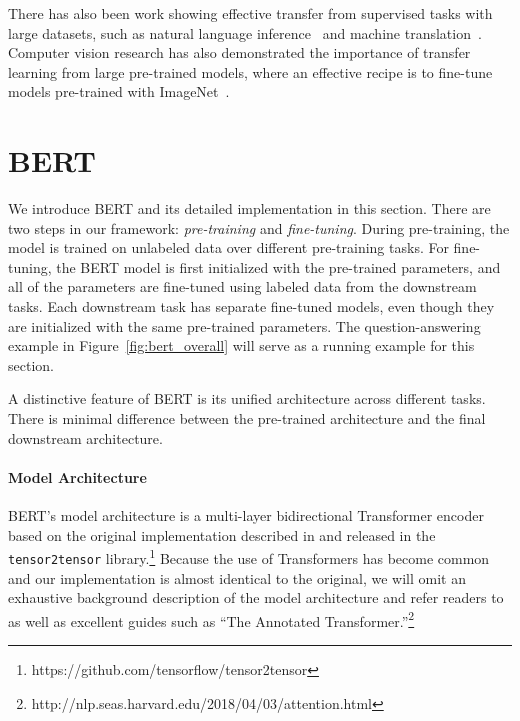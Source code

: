\documentclass[11pt,a4paper]{article}
\begin{document}
There has also been work showing effective transfer from supervised tasks with large datasets, such as natural language inference~\cite{conneau-EtAl:2017:EMNLP2017} and machine translation~\cite{mccann-etal:2017:_learn_trans}. 
Computer vision research has also demonstrated the importance of transfer learning from large pre-trained models, where an effective recipe is to fine-tune models pre-trained with ImageNet~\cite{imagenet_cvpr09, yosinski2014transferable}. 



 




\section{BERT}
\label{sec:bert}

We introduce BERT and its detailed implementation in this section. There are two steps in our framework: {\em pre-training} and {\em fine-tuning}. 
During pre-training, the model is trained on unlabeled data over different pre-training tasks.
For fine-tuning, the BERT model is first initialized with the pre-trained parameters, and all of the parameters are fine-tuned using labeled data from the downstream tasks. 
Each downstream task has separate fine-tuned models, even though they
are initialized with the same pre-trained parameters. The question-answering example in Figure~\ref{fig:bert_overall} will serve as a running example for this section.

A distinctive feature of BERT is its unified architecture across different tasks.
There is minimal difference between the pre-trained architecture and the final downstream architecture.

\paragraph{Model Architecture}
BERT's model architecture is a multi-layer bidirectional Transformer encoder based on the original implementation described in \citet{vaswani-etal:2017:_atten} and released in the {\tt tensor2tensor} library.\footnote{https://github.com/tensorflow/tensor2tensor} Because the use of Transformers has become common and our implementation is almost identical to the original, we will omit an exhaustive background description of the model architecture and refer readers to \citet{vaswani-etal:2017:_atten} as well as excellent guides such as ``The Annotated Transformer.''\footnote{http://nlp.seas.harvard.edu/2018/04/03/attention.html}
\end{document}
